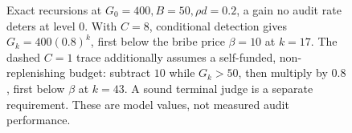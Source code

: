\begin{figure}[H]
\caption{Exact recursions at $G_0=400,B=50,\rho d=0.2$, a gain no audit rate deters at level 0. With $C=8$, conditional detection gives $G_k=400(0.8)^k$, first below the bribe price $\beta=10$ at $k=17$. The dashed $C=1$ trace additionally assumes a self-funded, non-replenishing budget: subtract $10$ while $G_k>50$, then multiply by $0.8$, first below $\beta$ at $k=43$. A sound terminal judge is a separate requirement. These are model values, not measured audit performance.}
\label{fig:rate-raters}
\end{figure}
